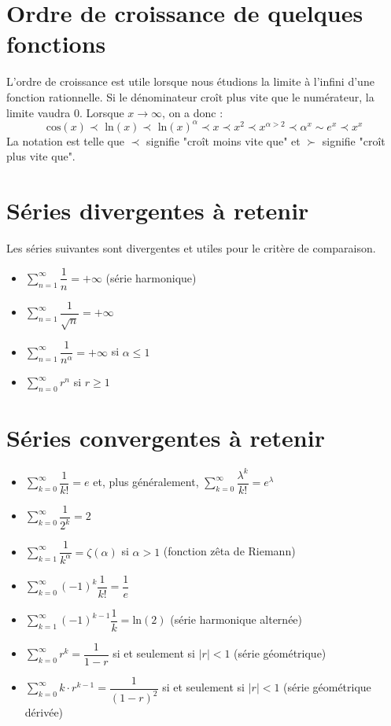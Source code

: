 \documentclass[10pt,a4paper]{book}
\begin{document}
\section{Ordre de croissance de quelques fonctions}
L'ordre de croissance est utile lorsque nous étudions la limite à l'infini d'une fonction rationnelle. Si le dénominateur croît plus vite que le numérateur, la limite vaudra 0. Lorsque $x\to\infty$, on a donc :
\[\text{cos}(x)\prec\text{ ln}(x)\prec\text{ ln}(x)^\alpha\prec x\prec x^2\prec x^{\alpha>2}\prec \alpha^x\sim e^x\prec x^x\]
La notation est telle que $\prec$ signifie "croît moins vite que" et $\succ$ signifie "croît plus vite que".

\section{Séries divergentes à retenir}
Les séries suivantes sont divergentes et utiles pour le critère de comparaison.
\begin{itemize}
\item $\sum_{n=1}^\infty \dfrac{1}{n} = +\infty$ (série harmonique)
\item $\sum_{n=1}^\infty \dfrac{1}{\sqrt{n}} = +\infty$
\item $\sum_{n=1}^\infty \dfrac{1}{n^\alpha} = +\infty$ si $\alpha\leq 1$
\item $\sum_{n=0}^\infty r^n$ si $r\geq 1$
\end{itemize}

\section{Séries convergentes à retenir}
\begin{itemize}
\item $\sum_{k=0}^\infty \dfrac{1}{k!} = e$ et, plus généralement, $\sum_{k=0}^\infty \dfrac{\lambda^k}{k!} = e^\lambda$
\item $\sum_{k=0}^\infty \dfrac{1}{2^k} = 2$
\item $\sum_{k=1}^\infty \dfrac{1}{k^\alpha} = \zeta(\alpha)$ si $\alpha > 1$ (fonction zêta de Riemann)
\item $\sum_{k=0}^\infty (-1)^k\dfrac{1}{k!} = \dfrac{1}{e}$
\item $\sum_{k=1}^\infty (-1)^{k-1} \dfrac{1}{k} = \text{ln}(2)$ (série harmonique alternée)
\item $\sum_{k=0}^\infty r^k = \dfrac{1}{1-r}$ si et seulement si $|r|<1$ (série géométrique)
\item $\sum_{k=0}^\infty k\cdot r^{k-1} = \dfrac{1}{(1-r)^2}$ si et seulement si $|r|<1$ (série géométrique dérivée)
\end{itemize}
\end{document}

